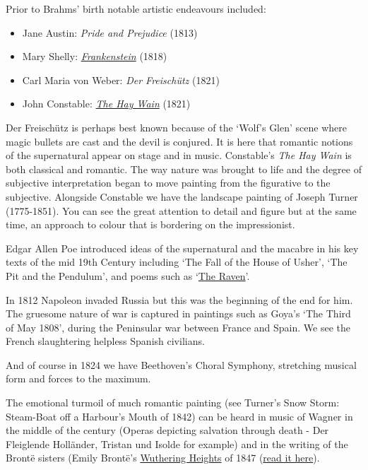 Prior to Brahms' birth notable artistic endeavours included:
\begin{itemize}
\item Jane Austin: \textit{Pride and Prejudice} (1813)
\item Mary Shelly: \textit{\href{http://www.gutenberg.org/files/84/84-h/84-h.htm}{Frankenstein}} (1818)
\item Carl Maria von Weber: \textit{Der Freisch\"utz} (1821)
\item John Constable: \textit{\href{http://www.nationalgallery.org.uk/paintings/john-constable-the-hay-wain}{The Hay Wain}} (1821)  
\end{itemize}

Der Freisch\"utz is perhaps best known because of the `Wolf's Glen' scene where magic bullets are cast and the devil is conjured. It is here that romantic notions of the supernatural appear on stage and in music. Constable's \textit{The Hay Wain} is both classical and romantic. The way nature was brought to life and the degree of subjective interpretation began to move painting from the figurative to the subjective. Alongside Constable we have the landscape painting of Joseph Turner (1775-1851). You can see the great attention to detail and figure but at the same time, an approach to colour that is bordering on the impressionist. 

Edgar Allen Poe introduced ideas of the supernatural and the macabre in his key texts of the mid 19th Century including `The Fall of the House of Usher', `The Pit and the Pendulum', and poems such as `\href{https://www.youtube.com/watch?v=0K6-wO94-6I}{The Raven}'.  


In 1812 Napoleon invaded Russia but this was the beginning of the end for him. The gruesome nature of war is captured in paintings such as Goya's `The Third of May 1808', during the Peninsular war between France and Spain. We see the French slaughtering helpless Spanish civilians.   

And of course in 1824 we have Beethoven's Choral Symphony, stretching musical form and forces to the maximum. 

The emotional turmoil of much romantic painting (see Turner's Snow Storm: Steam-Boat off a Harbour's Mouth of 1842) can be heard in music of Wagner in the middle of the century (Operas depicting salvation through death - Der Fleiglende Holl\"ander, Tristan und Isolde for example) and in the writing of the Bront\"e sisters (Emily Bront\"e's \href{http://www.wuthering-heights.co.uk/index.php}{Wuthering Heights} of 1847 (\href{http://www.gutenberg.org/ebooks/768}{read it here}).

